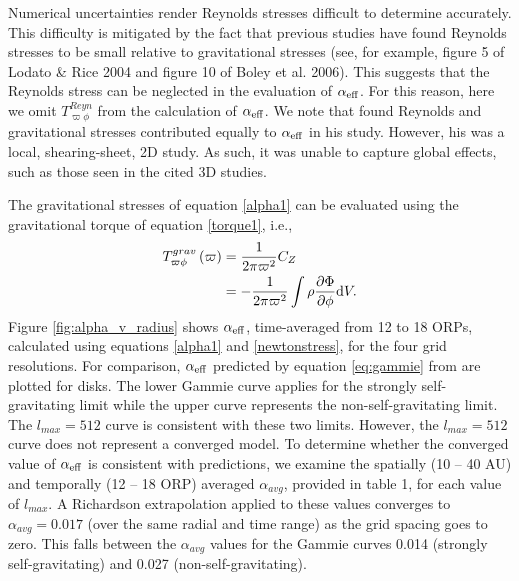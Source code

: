 \documentclass[manuscript]{aastex}
\begin{document}
  

Numerical uncertainties render Reynolds stresses difficult to determine accurately. 
This difficulty is mitigated by the fact that 
previous studies have found Reynolds stresses to be small relative to gravitational stresses (see, 
for example, figure 5 of Lodato \& Rice 2004 and figure 10 of Boley et al. 2006).  This  suggests that the Reynolds stress
can be neglected in the evaluation of $\alpha_{\rm{eff}}$.   For this reason, 
here we omit
$T_{\varpi\phi}^{Reyn}$ from the calculation of $\alpha_{\rm{eff}}$. 
We note that \cite{gammie2001}  found
Reynolds and gravitational stresses contributed equally to $\alpha_{\rm{eff}}$ in his study.  However,
his was a local, shearing-sheet, 2D study.  As such, it was unable to capture global effects, such
as those seen in the cited 3D studies.  


The gravitational stresses of equation \eqref{alpha1} can be evaluated using the gravitational torque of equation \eqref{torque1}, i.e.,
\begin{equation}
\label{newtonstress}
\begin{split}
 T_{\varpi\phi}^{grav}\left( \varpi \right) & = \frac{1}{2\pi\varpi^2}C_Z\\
                                & = - \frac{1}{2\pi\varpi^2} \int \rho\frac{\partial\Phi}{\partial\phi} {\rm d}V.
\end{split}
\end{equation}
Figure \ref{fig:alpha_v_radius} shows $\alpha_{\rm{eff}}$, time-averaged from 12 to 18 ORPs, calculated using equations \eqref{alpha1} and \eqref{newtonstress},
for the four grid resolutions.  For comparison, 
$\alpha_{\rm{eff}}$ predicted by equation \eqref{eq:gammie} from \citet{gammie2001} are plotted for disks.  The lower  Gammie curve applies for the strongly self-gravitating limit while the upper curve 
represents the non-self-gravitating limit.   The $l_{max} = 512$ curve is consistent with these two limits.  However, 
the  $l_{max} = 512$ curve does not represent a converged model.
To determine whether the converged value of $\alpha_{\rm{eff}}$ is consistent with predictions, we examine 
the spatially (10 -- 40 AU) and temporally (12 -- 18 ORP) averaged  $\alpha_{avg}$,
provided in table 1, for each value of  $l_{max}$.    A Richardson extrapolation applied to these values  
converges to $\alpha_{avg} = 0.017$ (over the same radial  and time range)
as the grid spacing goes to zero.   This falls
between the $\alpha_{avg}$ values for the Gammie curves 0.014 (strongly self-gravitating) and 0.027 (non-self-gravitating).
\end{document}
